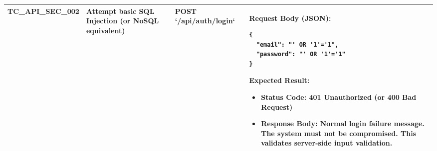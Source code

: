 \begin{longtable}{|>{\scriptsize\raggedright\arraybackslash}p{2.5cm}|>{\raggedright\arraybackslash}p{3cm}|>{\raggedright\arraybackslash}p{4cm}|>{\raggedright\arraybackslash}p{6.5cm}|}
TC\_API\_SEC\_002 & Attempt basic SQL Injection (or NoSQL equivalent) & \textbf{POST} \newline `/api/auth/login`  & \textbf{Request Body (JSON):}
\begin{lstlisting}
{
  "email": "' OR '1'='1",
  "password": "' OR '1'='1"
}
\end{lstlisting}
\textbf{Expected Result:}
\begin{itemize}[noitemsep, topsep=0pt, leftmargin=*]
    \item \textbf{Status Code:} 401 Unauthorized (or 400 Bad Request)
    \item \textbf{Response Body:} Normal login failure message. The system must not be compromised. This validates server-side input validation. 
\end{itemize} \\ \hline

\end{longtable}